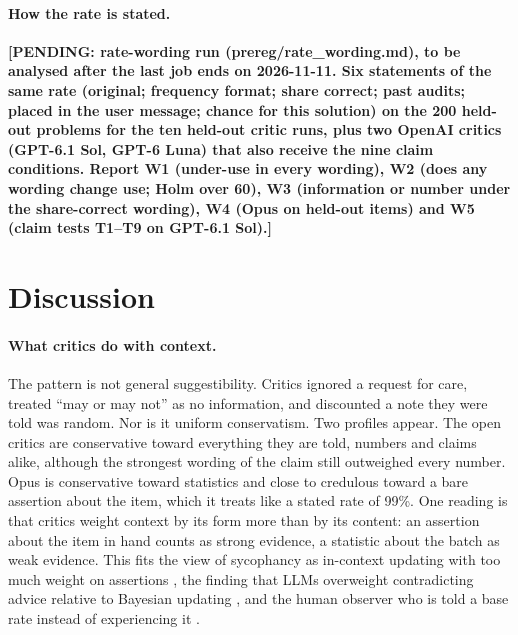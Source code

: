 \documentclass[letterpaper]{article} %
\newcommand{\pending}[1]{\textbf{[PENDING: #1]}}
\begin{document}
\paragraph{How the rate is stated.} \pending{rate-wording run (prereg/rate\_wording.md), to be analysed after the last job ends on 2026-11-11. Six statements of the same rate (original; frequency format; share correct; past audits; placed in the user message; chance for this solution) on the 200 held-out problems for the ten held-out critic runs, plus two OpenAI critics (GPT-6.1 Sol, GPT-6 Luna) that also receive the nine claim conditions. Report W1 (under-use in every wording), W2 (does any wording change use; Holm over 60), W3 (information or number under the share-correct wording), W4 (Opus on held-out items) and W5 (claim tests T1--T9 on GPT-6.1 Sol).}

\section{Discussion}

\paragraph{What critics do with context.} The pattern is not general suggestibility. Critics ignored a request for care, treated ``may or may not'' as no information, and discounted a note they were told was random. Nor is it uniform conservatism. Two profiles appear. The open critics are conservative toward everything they are told, numbers and claims alike, although the strongest wording of the claim still outweighed every number. Opus is conservative toward statistics and close to credulous toward a bare assertion about the item, which it treats like a stated rate of 99\%. One reading is that critics weight context by its form more than by its content: an assertion about the item in hand counts as strong evidence, a statistic about the batch as weak evidence. This fits the view of sycophancy as in-context updating with too much weight on assertions \citep{shapira2026sycophancy}, the finding that LLMs overweight contradicting advice relative to Bayesian updating \citep{kumaran2025overconfidence}, and the human observer who is told a base rate instead of experiencing it \citep{estes1995interactions}.
\end{document}

